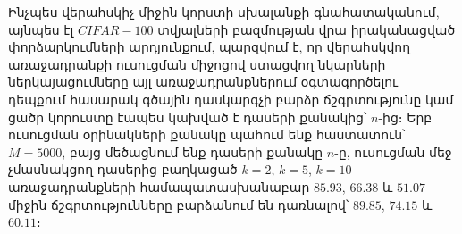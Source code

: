 \documentclass[12pt]{article}
\begin{document}
\par Ինչպես վերահսկիչ միջին կորստի սխալանքի գնահատականում, այնպես էլ $CIFAR-100$ տվյալների բազմության վրա իրականացված փորձարկումների արդյունքում, պարզվում է, որ վերահսկվող առաջադրանքի ուսուցման միջոցով ստացվող նկարների ներկայացումները այլ առաջադրանքներում օգտագործելու դեպքում հասարակ գծային դասկարգչի բարձր ճշգրտությունը կամ ցածր կորուստը էապես կախված է դասերի քանակից՝ $n$-ից։  Երբ ուսուցման օրինակների քանակը պահում ենք հաստատուն՝ $M=5000$, բայց մեծացնում ենք դասերի քանակը $n$-ը, ուսուցման մեջ չմասնակցող դասերից բաղկացած $k=2$, $k=5$, $k=10$ առաջադրանքների համապատասխանաբար $85.93$, $66.38$ և $51.07$ միջին ճշգրտությունները բարձանում են դառնալով՝ $89.85$, $74.15$ և $60.11$։ 
%

\vspace{10mm}
\end{document}
